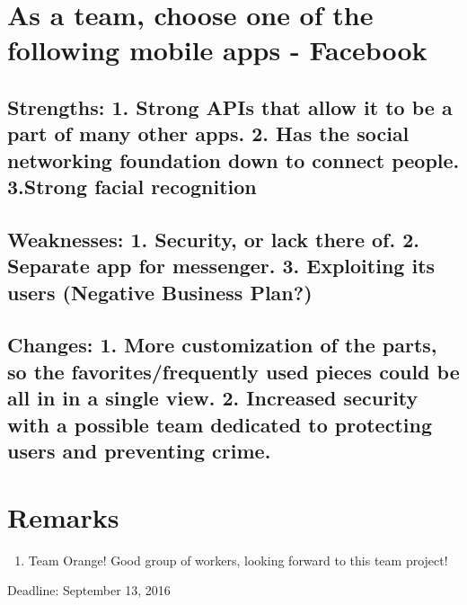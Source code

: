 \documentclass [10pt] {article}
\begin{document}
\section{As a team, choose one of the following mobile apps - Facebook}
\subsection{Strengths: 1. Strong APIs that allow it to be a part of many other apps. 2. Has the social networking foundation down to connect people. 3.Strong facial recognition}
\subsection{Weaknesses: 1. Security, or lack there of. 2. Separate app for messenger. 3. Exploiting its users (Negative Business Plan?)}
\subsection{Changes: 1. More customization of the parts, so the favorites/frequently used pieces could be all in in a single view. 2. Increased security with a possible team dedicated to protecting users and preventing crime.}


\section{Remarks}
\begin{enumerate}
\item Team Orange! Good group of workers, looking forward to this team project!
\end{enumerate}

Deadline: September 13, 2016
\end{document}

